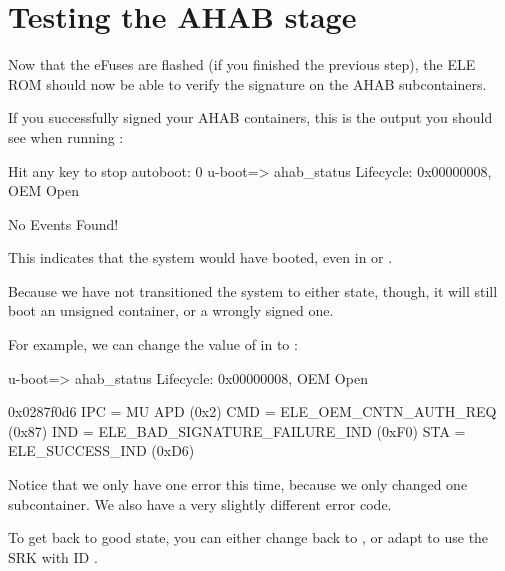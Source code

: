 \section{Testing the AHAB stage}

Now that the eFuses are flashed (if you finished the previous step), the ELE ROM should now be able
to verify the signature on the AHAB subcontainers.

If you successfully signed your AHAB containers, this is the output you should see when running :

\begin{bashinput}
Hit any key to stop autoboot:  0 
u-boot=> ahab_status
Lifecycle: 0x00000008, OEM Open


        No Events Found!

\end{bashinput}

This indicates that the system would have booted, even in  or .

Because we have not transitioned the system to either state, though, it will still boot an unsigned
container, or a wrongly signed one.

For example, we can change the value of  in  to :
\begin{bashinput}
u-boot=> ahab_status
Lifecycle: 0x00000008, OEM Open


        0x0287f0d6
        IPC = MU APD (0x2)
        CMD = ELE_OEM_CNTN_AUTH_REQ (0x87)
        IND = ELE_BAD_SIGNATURE_FAILURE_IND (0xF0)
        STA = ELE_SUCCESS_IND (0xD6)

\end{bashinput}

Notice that we only have one error this time, because we only changed one subcontainer.
We also have a very slightly different error code.

To get back to good state, you can either change  back to , or adapt
 to use the SRK with ID .

